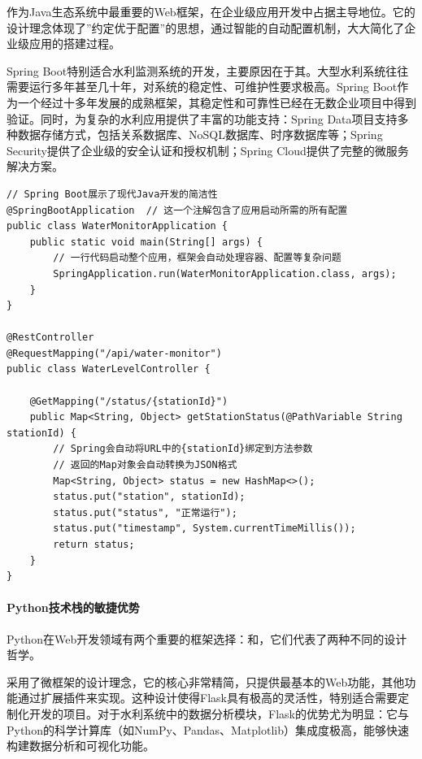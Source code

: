 作为Java生态系统中最重要的Web框架，在企业级应用开发中占据主导地位。它的设计理念体现了''约定优于配置''的思想，通过智能的自动配置机制，大大简化了企业级应用的搭建过程。

Spring Boot特别适合水利监测系统的开发，主要原因在于其。大型水利系统往往需要运行多年甚至几十年，对系统的稳定性、可维护性要求极高。Spring Boot作为一个经过十多年发展的成熟框架，其稳定性和可靠性已经在无数企业项目中得到验证。同时，为复杂的水利应用提供了丰富的功能支持：Spring Data项目支持多种数据存储方式，包括关系数据库、NoSQL数据库、时序数据库等；Spring Security提供了企业级的安全认证和授权机制；Spring Cloud提供了完整的微服务解决方案。

\begin{lstlisting}[style=java]
// Spring Boot展示了现代Java开发的简洁性
@SpringBootApplication  // 这一个注解包含了应用启动所需的所有配置
public class WaterMonitorApplication {
    public static void main(String[] args) {
        // 一行代码启动整个应用，框架会自动处理容器、配置等复杂问题
        SpringApplication.run(WaterMonitorApplication.class, args);
    }
}

@RestController
@RequestMapping("/api/water-monitor")
public class WaterLevelController {
    
    @GetMapping("/status/{stationId}")
    public Map<String, Object> getStationStatus(@PathVariable String stationId) {
        // Spring会自动将URL中的{stationId}绑定到方法参数
        // 返回的Map对象会自动转换为JSON格式
        Map<String, Object> status = new HashMap<>();
        status.put("station", stationId);
        status.put("status", "正常运行");
        status.put("timestamp", System.currentTimeMillis());
        return status;
    }
}
\end{lstlisting}

\hypertarget{pythonux6280ux672fux6808ux7684ux654fux6377ux4f18ux52bf}{%
\paragraph{Python技术栈的敏捷优势}\label{pythonux6280ux672fux6808ux7684ux654fux6377ux4f18ux52bf}}

Python在Web开发领域有两个重要的框架选择：和，它们代表了两种不同的设计哲学。

采用了微框架的设计理念，它的核心非常精简，只提供最基本的Web功能，其他功能通过扩展插件来实现。这种设计使得Flask具有极高的灵活性，特别适合需要定制化开发的项目。对于水利系统中的数据分析模块，Flask的优势尤为明显：它与Python的科学计算库（如NumPy、Pandas、Matplotlib）集成度极高，能够快速构建数据分析和可视化功能。

